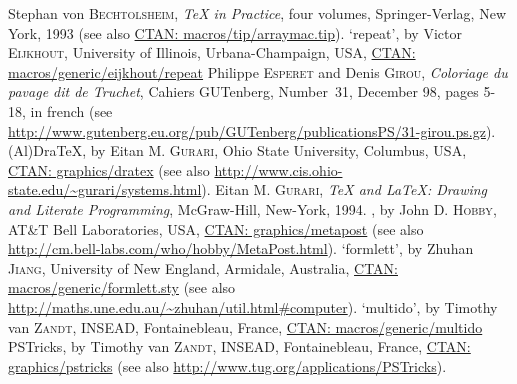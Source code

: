\documentclass{article}
\newcommand{\AlDraTeXPackage}{\textsf{(Al)Dra\TeX}}
\newcommand{\FormLettPackage}{`\textsf{formlett}'}
\newcommand{\MetaPostPackage}{\MP}
\newcommand{\MultiDoPackage}{`\textsf{multido}'}
\newcommand{\PSTricksPackage}{\textsf{PSTricks}}
\newcommand{\RepeatPackage}{`\textsf{repeat}'}
\begin{document}
\begin{thebibliography}{9}
   Stephan von  \textsc{Bechtolsheim}, \emph{\TeX{} in
  Practice}, four volumes, Springer-Verlag, New York, 1993 (see also
  \url{CTAN: macros/tip/arraymac.tip}).
   \RepeatPackage, by Victor \textsc{Eijkhout}, University of
  Illinois, Urbana-Champaign, USA, \url{CTAN: macros/generic/eijkhout/repeat}
   Philippe \textsc{Esperet} and Denis \textsc{Girou},
  \emph{Coloriage du pavage dit de Truchet}, Cahiers GUTenberg, Number~31,
  December 98, pages 5-18, in french (see
  \url{http://www.gutenberg.eu.org/pub/GUTenberg/publicationsPS/31-girou.ps.gz}).
   \AlDraTeXPackage, by Eitan M. \textsc{Gurari}, Ohio State
  University, Columbus, USA, \url{CTAN: graphics/dratex} (see also
  \url{http://www.cis.ohio-state.edu/~gurari/systems.html}).
   Eitan M. \textsc{Gurari}, \emph{\TeX{} and \LaTeX: Drawing
  and Literate Programming}, McGraw-Hill, New-York, 1994.
   \MetaPostPackage, by John D. \textsc{Hobby}, AT\&T Bell
  Laboratories, USA, \url{CTAN: graphics/metapost} (see also
  \url{http://cm.bell-labs.com/who/hobby/MetaPost.html}).
   \FormLettPackage, by Zhuhan \textsc{Jiang}, University of
  New England, Armidale, Australia, \url{CTAN: macros/generic/formlett.sty} (see
  also \url{http://maths.une.edu.au/~zhuhan/util.html#computer}).
   \MultiDoPackage, by Timothy van \textsc{Zandt}, INSEAD,
  Fontainebleau, France, \url{CTAN: macros/generic/multido}
   \PSTricksPackage, by Timothy van \textsc{Zandt}, INSEAD,
  Fontainebleau, France, \url{CTAN: graphics/pstricks} (see also
  \url{http://www.tug.org/applications/PSTricks}).
\end{thebibliography}
\end{document}
